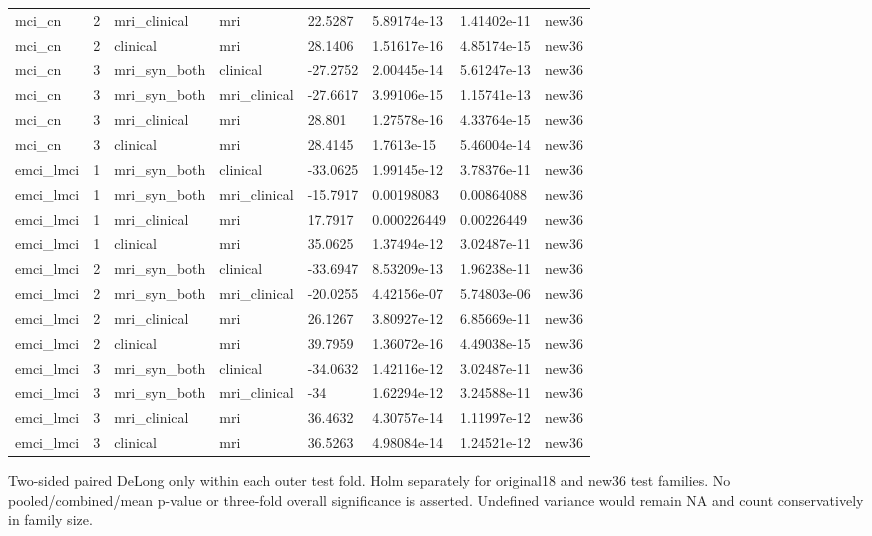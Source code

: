 \begin{landscape}
\begin{longtable}{llllllll}
mci\_cn & 2 & mri\_clinical & mri & 22.5287 & 5.89174e-13 & 1.41402e-11 & new36 \\
mci\_cn & 2 & clinical & mri & 28.1406 & 1.51617e-16 & 4.85174e-15 & new36 \\
mci\_cn & 3 & mri\_syn\_both & clinical & -27.2752 & 2.00445e-14 & 5.61247e-13 & new36 \\
mci\_cn & 3 & mri\_syn\_both & mri\_clinical & -27.6617 & 3.99106e-15 & 1.15741e-13 & new36 \\
mci\_cn & 3 & mri\_clinical & mri & 28.801 & 1.27578e-16 & 4.33764e-15 & new36 \\
mci\_cn & 3 & clinical & mri & 28.4145 & 1.7613e-15 & 5.46004e-14 & new36 \\
emci\_lmci & 1 & mri\_syn\_both & clinical & -33.0625 & 1.99145e-12 & 3.78376e-11 & new36 \\
emci\_lmci & 1 & mri\_syn\_both & mri\_clinical & -15.7917 & 0.00198083 & 0.00864088 & new36 \\
emci\_lmci & 1 & mri\_clinical & mri & 17.7917 & 0.000226449 & 0.00226449 & new36 \\
emci\_lmci & 1 & clinical & mri & 35.0625 & 1.37494e-12 & 3.02487e-11 & new36 \\
emci\_lmci & 2 & mri\_syn\_both & clinical & -33.6947 & 8.53209e-13 & 1.96238e-11 & new36 \\
emci\_lmci & 2 & mri\_syn\_both & mri\_clinical & -20.0255 & 4.42156e-07 & 5.74803e-06 & new36 \\
emci\_lmci & 2 & mri\_clinical & mri & 26.1267 & 3.80927e-12 & 6.85669e-11 & new36 \\
emci\_lmci & 2 & clinical & mri & 39.7959 & 1.36072e-16 & 4.49038e-15 & new36 \\
emci\_lmci & 3 & mri\_syn\_both & clinical & -34.0632 & 1.42116e-12 & 3.02487e-11 & new36 \\
emci\_lmci & 3 & mri\_syn\_both & mri\_clinical & -34 & 1.62294e-12 & 3.24588e-11 & new36 \\
emci\_lmci & 3 & mri\_clinical & mri & 36.4632 & 4.30757e-14 & 1.11997e-12 & new36 \\
emci\_lmci & 3 & clinical & mri & 36.5263 & 4.98084e-14 & 1.24521e-12 & new36 \\
\end{longtable}
\noindent\parbox{\linewidth}{\footnotesize Two-sided paired DeLong only within each outer test fold. Holm separately for original18 and new36 test families. No pooled/combined/mean p-value or three-fold overall significance is asserted. Undefined variance would remain NA and count conservatively in family size.}
\endgroup
\end{landscape}
